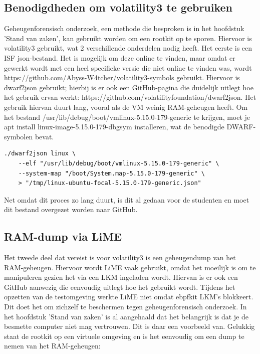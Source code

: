 \subsection{Benodigdheden om volatility3 te gebruiken}
Geheugenforensisch onderzoek, een methode die besproken is in het hoofdstuk 'Stand van zaken', kan gebruikt worden om een rootkit op te sporen.
Hiervoor is volatility3 gebruikt, wat 2 verschillende onderdelen nodig heeft. Het eerste is een ISF json-bestand.
Het is mogelijk om deze online te vinden, maar omdat er gewerkt wordt met een heel specifieke versie die niet online te vinden was, wordt https://github.com/Abyss-W4tcher/volatility3-symbols gebruikt.
Hiervoor is dwarf2json gebruikt; hierbij is er ook een GitHub-pagina die duidelijk uitlegt hoe het gebruik ervan werkt: https://github.com/volatilityfoundation/dwarf2json.
Het gebruik hiervan duurt lang, vooral als de VM weinig RAM-geheugen heeft.
Om het bestand /usr/lib/debug/boot/vmlinux-5.15.0-179-generic te krijgen, moet je apt install linux-image-5.15.0-179-dbgsym installeren, wat de benodigde DWARF-symbolen bevat.

\begin{verbatim}
./dwarf2json linux \
    --elf "/usr/lib/debug/boot/vmlinux-5.15.0-179-generic" \
    --system-map "/boot/System.map-5.15.0-179-generic" \
    > "/tmp/linux-ubuntu-focal-5.15.0-179-generic.json"
\end{verbatim}

Net omdat dit proces zo lang duurt, is dit al gedaan voor de studenten en moet dit bestand overgezet worden naar GitHub.

\subsection{RAM-dump via LiME}
Het tweede deel dat vereist is voor volatility3 is een geheugendump van het RAM-geheugen. Hiervoor wordt LiME vaak gebruikt, omdat het moeilijk is om te manipuleren gezien het via een LKM ingeladen wordt. Hiervan is er ook een GitHub aanwezig die eenvoudig uitlegt hoe het gebruikt wordt. Tijdens het opzetten van de testomgeving werkte LiME niet omdat ebpfkit LKM's blokkeert. Dit doet het om zichzelf te beschermen tegen geheugenforensisch onderzoek. In het hoofdstuk 'Stand van zaken' is al aangehaald dat het belangrijk is dat je de besmette computer niet mag vertrouwen. Dit is daar een voorbeeld van. Gelukkig staat de rootkit op een virtuele omgeving en is het eenvoudig om een dump te nemen van het RAM-geheugen:


